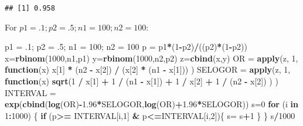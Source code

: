 \documentclass[]{article}
\newenvironment{Shaded}{\begin{snugshade}}{\end{snugshade}}
\newcommand{\KeywordTok}[1]{\textcolor[rgb]{0.13,0.29,0.53}{\textbf{#1}}}
\newcommand{\DecValTok}[1]{\textcolor[rgb]{0.00,0.00,0.81}{#1}}
\newcommand{\FloatTok}[1]{\textcolor[rgb]{0.00,0.00,0.81}{#1}}
\newcommand{\StringTok}[1]{\textcolor[rgb]{0.31,0.60,0.02}{#1}}
\newcommand{\ControlFlowTok}[1]{\textcolor[rgb]{0.13,0.29,0.53}{\textbf{#1}}}
\newcommand{\OperatorTok}[1]{\textcolor[rgb]{0.81,0.36,0.00}{\textbf{#1}}}
\newcommand{\NormalTok}[1]{#1}
\begin{document}
\begin{verbatim}
## [1] 0.958
\end{verbatim}

For \(p1 = .1; p2 = .5; n1 = 100; n2 = 100\):

\begin{Shaded}
\begin{Highlighting}[]
\NormalTok{p1 =}\StringTok{ }\NormalTok{.}\DecValTok{1}\NormalTok{; p2 =}\StringTok{ }\NormalTok{.}\DecValTok{5}\NormalTok{; n1 =}\StringTok{ }\DecValTok{100}\NormalTok{; n2 =}\StringTok{ }\DecValTok{100}
\NormalTok{p =}\StringTok{ }\NormalTok{p1}\OperatorTok{*}\NormalTok{(}\DecValTok{1}\OperatorTok{-}\NormalTok{p2)}\OperatorTok{/}\NormalTok{((p2)}\OperatorTok{*}\NormalTok{(}\DecValTok{1}\OperatorTok{-}\NormalTok{p2))}
\NormalTok{x=}\KeywordTok{rbinom}\NormalTok{(}\DecValTok{1000}\NormalTok{,n1,p1)}
\NormalTok{y=}\KeywordTok{rbinom}\NormalTok{(}\DecValTok{1000}\NormalTok{,n2,p2)}
\NormalTok{z=}\KeywordTok{cbind}\NormalTok{(x,y)}
\NormalTok{OR =}\StringTok{ }\KeywordTok{apply}\NormalTok{(z, }\DecValTok{1}\NormalTok{, }\ControlFlowTok{function}\NormalTok{(x) x[}\DecValTok{1}\NormalTok{] }\OperatorTok{*}\StringTok{ }\NormalTok{(n2 }\OperatorTok{-}\StringTok{ }\NormalTok{x[}\DecValTok{2}\NormalTok{]) }\OperatorTok{/}\StringTok{ }\NormalTok{(x[}\DecValTok{2}\NormalTok{] }\OperatorTok{*}\StringTok{ }\NormalTok{(n1 }\OperatorTok{-}\StringTok{ }\NormalTok{x[}\DecValTok{1}\NormalTok{])) )}
\NormalTok{SELOGOR =}\StringTok{ }\KeywordTok{apply}\NormalTok{(z, }\DecValTok{1}\NormalTok{, }\ControlFlowTok{function}\NormalTok{(x) }\KeywordTok{sqrt}\NormalTok{(}\DecValTok{1} \OperatorTok{/}\StringTok{ }\NormalTok{x[}\DecValTok{1}\NormalTok{] }\OperatorTok{+}\StringTok{ }\DecValTok{1} \OperatorTok{/}\StringTok{ }\NormalTok{(n1 }\OperatorTok{-}\StringTok{ }\NormalTok{x[}\DecValTok{1}\NormalTok{]) }\OperatorTok{+}\StringTok{ }\DecValTok{1} \OperatorTok{/}\StringTok{ }\NormalTok{x[}\DecValTok{2}\NormalTok{] }\OperatorTok{+}\StringTok{ }\DecValTok{1} \OperatorTok{/}\StringTok{ }\NormalTok{(n2 }\OperatorTok{-}\StringTok{ }\NormalTok{x[}\DecValTok{2}\NormalTok{]) ) )}
\NormalTok{INTERVAL =}\StringTok{ }\KeywordTok{exp}\NormalTok{(}\KeywordTok{cbind}\NormalTok{(}\KeywordTok{log}\NormalTok{(OR)}\OperatorTok{-}\FloatTok{1.96}\OperatorTok{*}\NormalTok{SELOGOR,}\KeywordTok{log}\NormalTok{(OR)}\OperatorTok{+}\FloatTok{1.96}\OperatorTok{*}\NormalTok{SELOGOR))}
\NormalTok{s=}\DecValTok{0}
\ControlFlowTok{for}\NormalTok{ (i }\ControlFlowTok{in} \DecValTok{1}\OperatorTok{:}\DecValTok{1000}\NormalTok{) \{}
  \ControlFlowTok{if}\NormalTok{ (p}\OperatorTok{>=}\StringTok{ }\NormalTok{INTERVAL[i,}\DecValTok{1}\NormalTok{] }\OperatorTok{&}\StringTok{ }\NormalTok{p}\OperatorTok{<=}\NormalTok{INTERVAL[i,}\DecValTok{2}\NormalTok{])\{}
\NormalTok{    s=}\StringTok{ }\NormalTok{s}\OperatorTok{+}\DecValTok{1}
\NormalTok{  \}}
\NormalTok{\}}
\NormalTok{s}\OperatorTok{/}\DecValTok{1000}
\end{Highlighting}
\end{Shaded}
\end{document}
